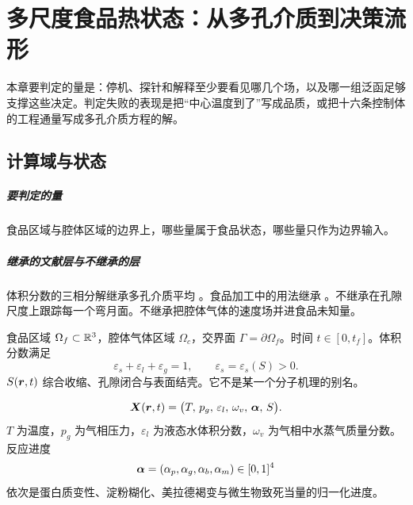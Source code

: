 \chapter{多尺度食品热状态：从多孔介质到决策流形}
\label{ch:physics}

本章要判定的量是：停机、探针和解释至少要看见哪几个场，以及哪一组泛函足够支撑这些决定。判定失败的表现是把“中心温度到了”写成品质，或把十六条控制体的工程通量写成多孔介质方程的解。

\section{计算域与状态}

\paragraph{要判定的量}
食品区域与腔体区域的边界上，哪些量属于食品状态，哪些量只作为边界输入。

\paragraph{继承的文献层与不继承的层}
体积分数的三相分解继承多孔介质平均 \cite{whitaker1977}。食品加工中的用法继承 \cite{datta2007}。不继承在孔隙尺度上跟踪每一个弯月面。不继承把腔体气体的速度场并进食品未知量。

食品区域 \(\Omega_f\subset\mathbb{R}^3\)，腔体气体区域 \(\Omega_c\)，交界面 \(\Gamma=\partial\Omega_f\)。时间 \(t\in[0,t_f]\)。体积分数满足
\begin{equation}
\varepsilon_s+\varepsilon_l+\varepsilon_g=1,\qquad \varepsilon_s=\varepsilon_s(S)>0.
\end{equation}
\(S(\bm{r},t)\) 综合收缩、孔隙闭合与表面结壳。它不是某一个分子机理的别名。

\begin{definition}[全场状态]
\label{def:fullstate}
\begin{equation}
\label{eq:state}
\bm{X}(\bm{r},t)=\big(T,\,p_g,\,\varepsilon_l,\,\omega_v,\,\bm{\alpha},\,S\big).
\end{equation}
\(T\) 为温度，\(p_g\) 为气相压力，\(\varepsilon_l\) 为液态水体积分数，\(\omega_v\) 为气相中水蒸气质量分数。反应进度
\begin{equation}
\bm{\alpha}=(\alpha_p,\alpha_g,\alpha_b,\alpha_m)\in[0,1]^4
\end{equation}
依次是蛋白质变性、淀粉糊化、美拉德褐变与微生物致死当量的归一化进度。
\end{definition}

